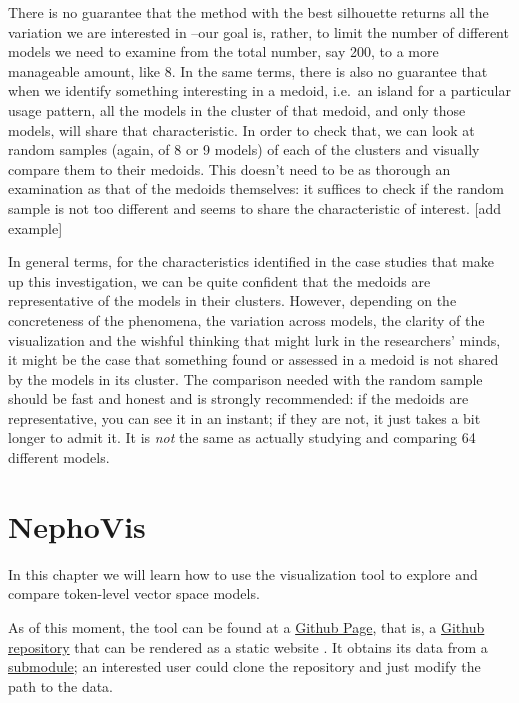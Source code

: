\documentclass[
]{book}
\begin{document}
There is no guarantee that the method with the best silhouette returns all the variation we
are interested in --our goal is, rather, to limit the number of different models we need to
examine from the total number, say 200, to a more manageable amount, like 8.
In the same terms, there is also no guarantee that when we identify something interesting
in a medoid, i.e.~an island for a particular usage pattern, all the models in the cluster of
that medoid, and only those models, will share that characteristic. In order to check that,
we can look at random samples (again, of 8 or 9 models) of each of the clusters and
visually compare them to their medoids. This doesn't need to be as thorough an examination as
that of the medoids themselves: it suffices to check if the random sample is not too different
and seems to share the characteristic of interest. {[}add example{]}

In general terms, for the characteristics identified in the case studies that make up this
investigation, we can be quite confident that the medoids are representative of the models in
their clusters. However, depending on the concreteness of the phenomena, the variation across
models, the clarity of the visualization and the wishful thinking that might lurk in the
researchers' minds, it might be the case that something found or assessed in a medoid is not
shared by the models in its cluster. The comparison needed with the random sample should be
fast and honest and is strongly recommended: if the medoids are representative, you can see it
in an instant; if they are not, it just takes a bit longer to admit it. It is \emph{not} the same as actually studying and comparing 64 different models.

\hypertarget{nephovis}{%
\chapter{NephoVis}\label{nephovis}}

In this chapter we will learn how to use the visualization tool to explore
and compare token-level vector space models.

As of this moment, the tool can be found at a
\href{https://qlvl.github.io/NephoVis}{Github Page}, that is,
a \href{https://github.com/qlvl/NephoVis}{Github repository} that can be rendered
as a static website \autocite{montes.qlvl_2021}.
It obtains its data from a \href{https://github.com/qlvl/tokenclouds}{submodule};
an interested user could clone the repository and just modify the path to the data.
\end{document}
